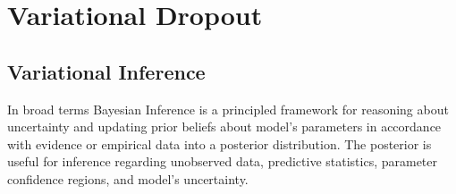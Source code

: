 \documentclass[a4paper,10pt,twocolumn]{article}
\begin{document}

\section{Variational Dropout} %
\label{sec:variational_dropout}

\subsection{Variational Inference} %
\label{sub:variational_inference}

In broad terms Bayesian Inference is a principled framework for reasoning about uncertainty
and updating prior beliefs about model's parameters in accordance with evidence or
empirical data into a posterior distribution. The posterior is useful for inference
regarding unobserved data, predictive statistics, parameter confidence regions, and
model's uncertainty.
\end{document}
